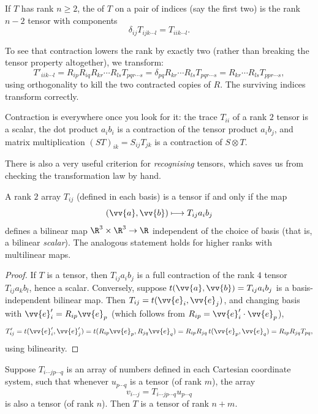 \begin{definition}[Contraction]
	If $T$ has rank $n \geq 2$, the  of $T$ on a pair of indices (say the first two) is the rank $n - 2$ tensor with components
	$$
	\delta_{ij} T_{ijk \cdots l} = T_{iik\cdots l}.
	$$
\end{definition}

To see that contraction lowers the rank by exactly two (rather than breaking the tensor property altogether), we transform:
$$
T'_{iik\cdots l} = R_{ip}R_{iq}R_{kr} \cdots R_{ls} T_{pqr\cdots s} = \delta_{pq} R_{kr}\cdots R_{ls} T_{pqr \cdots s} = R_{kr}\cdots R_{ls}T_{ppr\cdots s},
$$
using orthogonality to kill the two contracted copies of $R$. The surviving indices transform correctly.

Contraction is everywhere once you look for it: the trace $T_{ii}$ of a rank $2$ tensor is a scalar, the dot product $a_i b_i$ is a contraction of the tensor product $a_i b_j$, and matrix multiplication $(ST)_{ik} = S_{ij}T_{jk}$ is a contraction of $S \otimes T$.

There is also a very useful criterion for \emph{recognising} tensors, which saves us from checking the transformation law by hand.

\begin{proposition}
	A rank $2$ array $T_{ij}$ (defined in each basis) is a tensor if and only if the map
	$$
	(\vv{a}, \vv{b}) \longmapsto T_{ij} a_i b_j
	$$
	defines a bilinear map $\R^3 \times \R^3 \rightarrow \R$ independent of the choice of basis (that is, a bilinear \emph{scalar}). The analogous statement holds for higher ranks with multilinear maps.
\end{proposition}
\begin{proof}
	If $T$ is a tensor, then $T_{ij}a_ib_j$ is a full contraction of the rank $4$ tensor $T_{ij}a_kb_l$, hence a scalar. Conversely, suppose $t(\vv{a}, \vv{b}) = T_{ij}a_ib_j$ is a basis-independent bilinear map. Then $T_{ij} = t(\vv{e}_i, \vv{e}_j)$, and changing basis with $\vv{e}_i' = R_{ip}\vv{e}_p$ (which follows from $R_{ip} = \vv{e}_i' \cdot \vv{e}_p$),
	$$
	T'_{ij} = t(\vv{e}_i', \vv{e}_j') = t(R_{ip} \vv{e}_p, R_{jq}\vv{e}_q) = R_{ip}R_{jq} \, t(\vv{e}_p, \vv{e}_q) = R_{ip}R_{jq}T_{pq},
	$$
	using bilinearity.
\end{proof}

\begin{theorem}
	Suppose $T_{i \cdots j p \cdots q}$ is an array of numbers defined in each Cartesian coordinate system, such that whenever $u_{p \cdots q}$ is a tensor (of rank $m$), the array
	$$
	v_{i \cdots j} = T_{i\cdots j p \cdots q} u_{p \cdots q}
	$$
	is also a tensor (of rank $n$). Then $T$ is a tensor of rank $n + m$.
\end{theorem}

